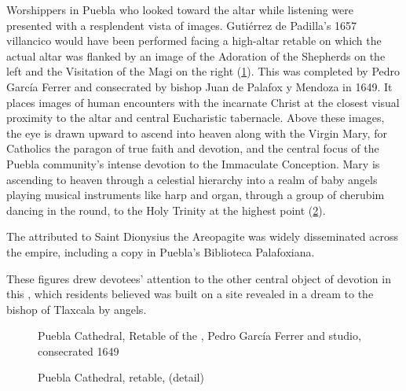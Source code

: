 Worshippers in Puebla who looked toward the altar while listening were presented
with a resplendent vista of images.
Gutiérrez de Padilla's 1657 villancico would have been performed facing a
high-altar retable on which the actual altar was flanked by an image of the
Adoration of the Shepherds on the left and the Visitation of the Magi on the
right (\cref{fig:Puebla-Ferrer-Retablo}).
This  was completed by Pedro García Ferrer and
consecrated by bishop Juan de Palafox y Mendoza in 1649.
It places images of human encounters with the incarnate Christ at the closest
visual proximity to the altar and central Eucharistic tabernacle.%
    \Autocite{Gali:GarciaFerrer}
Above these images, the eye is drawn upward to ascend into heaven along with the
Virgin Mary, for Catholics the paragon of true faith and devotion, and the
central focus of the Puebla community's intense devotion to the Immaculate
Conception.
Mary is ascending to heaven through a celestial hierarchy  into a realm of baby
angels playing musical instruments like harp and organ, through a group of
cherubim dancing in the round, to the Holy Trinity at the highest point
(\cref{fig:Puebla-Ferrer-BMV}).%
\begin{Footnote}
    The  attributed to Saint Dionysius the
    Areopagite was widely disseminated across the empire, including a
    copy in Puebla's Biblioteca Palafoxiana.
\end{Footnote}
These figures drew devotees' attention to the other central object of devotion
in this , which residents believed was built on a
site revealed in a dream to the bishop of Tlaxcala by angels.%
    \Autocites
    [67--68]{Lomeli:Puebla}
    [21]{AngelContreras:Puebla}

\begin{figure}
    \caption{Puebla Cathedral, Retable of the , Pedro
    García Ferrer and studio, consecrated 1649}
  
    \label{fig:Puebla-Ferrer-Retablo}
\end{figure}

\begin{figure}
    \caption{Puebla Cathedral, retable, 
    (detail)} 
  
    \label{fig:Puebla-Ferrer-BMV}
\end{figure}

